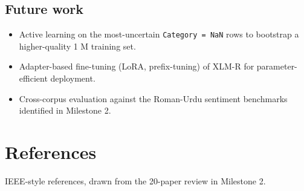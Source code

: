 \documentclass[
  english,
  11pt,
]{article}
\providecommand{\tightlist}{%
  \setlength{\itemsep}{0pt}\setlength{\parskip}{0pt}}
\begin{document}
\subsection{Future work}\label{future-work}

\begin{itemize}
\tightlist
\item
  Active learning on the most-uncertain \texttt{Category\ =\ NaN} rows
  to bootstrap a higher-quality 1 M training set.
\item
  Adapter-based fine-tuning (LoRA, prefix-tuning) of XLM-R for
  parameter-efficient deployment.
\item
  Cross-corpus evaluation against the Roman-Urdu sentiment benchmarks
  identified in Milestone 2.
\end{itemize}

\section{References}\label{references}

IEEE-style references, drawn from the 20-paper review in Milestone 2.
\end{document}
